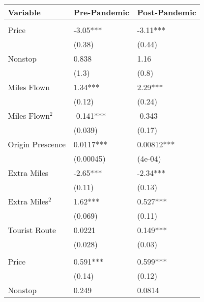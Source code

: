 
\begin{tabular}[t]{lll}
\toprule
Variable & Pre-Pandemic & Post-Pandemic\\
\midrule
\addlinespace[0.3em]
\multicolumn{3}{l}{\textbf{Linear Coefficients}}\\
\hspace{1em}Price & -3.05*** & -3.11***\\
\hspace{1em} & (0.38) & (0.44)\\
\hspace{1em}Nonstop & 0.838 & 1.16\\
\hspace{1em} & (1.3) & (0.8)\\
\hspace{1em}Miles Flown & 1.34*** & 2.29***\\
\hspace{1em} & (0.12) & (0.24)\\
\hspace{1em}Miles Flown$^2$ & -0.141*** & -0.343\\
\hspace{1em} & (0.039) & (0.17)\\
\hspace{1em}Origin Prescence & 0.0117*** & 0.00812***\\
\hspace{1em} & (0.00045) & (4e-04)\\
\hspace{1em}Extra Miles & -2.65*** & -2.34***\\
\hspace{1em} & (0.11) & (0.13)\\
\hspace{1em}Extra Miles$^2$ & 1.62*** & 0.527***\\
\hspace{1em} & (0.069) & (0.11)\\
\hspace{1em}Tourist Route & 0.0221 & 0.149***\\
\hspace{1em} & (0.028) & (0.03)\\
\midrule
\addlinespace[0.3em]
\multicolumn{3}{l}{\textbf{Nonlinear Coefficients}}\\
\hspace{1em}Price & 0.591*** & 0.599***\\
\hspace{1em} & (0.14) & (0.12)\\
\hspace{1em}Nonstop & 0.249 & 0.0814\\

\end{tabular}
